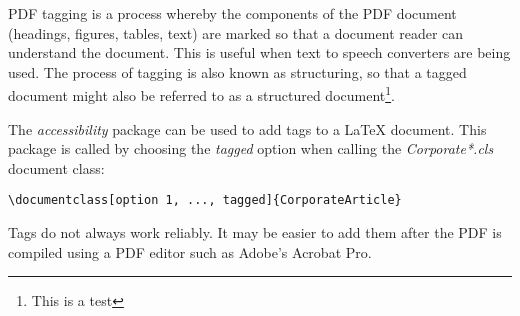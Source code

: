 PDF tagging is a process whereby the components of the PDF document (headings, figures, tables, text) are marked so that a document reader can understand the document. This is useful when text to speech converters are being used. The process of tagging is also known as structuring, so that a tagged document might also be referred to as a structured document\footnote{This is a test}.

The \emph{accessibility} package can be used to add tags to a LaTeX document. This package is called by choosing the \emph{tagged} option when calling the \emph{Corporate*.cls} document class:

\begin{lstlisting}[language={[LaTeX]Tex}]
\documentclass[option 1, ..., tagged]{CorporateArticle}
\end{lstlisting}

Tags do not always work reliably. It may be easier to add them after the PDF is compiled using a PDF editor such as Adobe's Acrobat Pro. 
